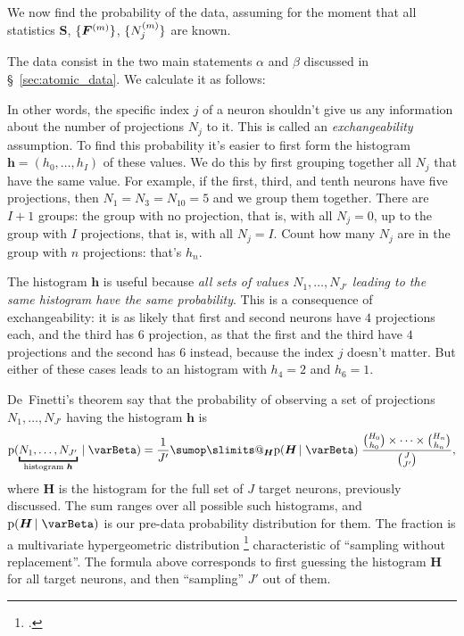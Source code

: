 \documentclass[\ifafour a4paper,12pt,\else a5paper,10pt,\fi%
onecolumn,oneside,article,%
british%
]{memoir}
\makeatletter
\theoremstyle{remark}
\theoremstyle{innote}
\def\sum{\DOTSI\sumop\slimits@}
\newcommand*{\citep}{\footcites}
\newcommand*{\pf}{\mathrm{p}}%
\renewcommand*{\|}[1][]{\nonscript\,#1\vert\nonscript\;\mathopen{}}
\newcommand*{\sect}{\S}%
\newcommand*{\chap}{ch.}%
\newcommand*{\yI}{\varBeta}
\newcommand*{\yF}{\bm{F}}
\newcommand*{\yFm}[1][m]{\yF^{(#1)}}
\newcommand*{\yh}{\bm{h}}
\newcommand*{\yH}{\bm{H}}
\newcommand*{\yNm}[1][m]{N^{(#1)}}
\newcommand*{\ySS}{S}
\newcommand*{\yS}{\bm{\ySS}}
\DeclarePairedDelimiter\tu{\{}{\}}
\newcommand*{\ka}{\alpha}
\newcommand*{\kb}{\beta}
\makeatother
\begin{document}
\medskip

We now find the probability of the data, assuming for the moment that all
statistics $\yS$, $\tu{\yFm}$, $\tu{\yNm_{j}}$ are known.

The data consist in the two main statements $\ka$ and $\kb$ discussed in
\sect~\ref{sec:atomic_data}. We calculate it as follows:






\clearpage

\bigskip


In other words, the specific index $j$
of a neuron shouldn't give us any information about the number of
projections $N_{j}$ to it. This is called an \emph{exchangeability}
assumption. To find this probability it's easier to first form the
histogram $\yh=(h_{0},\dotsc,h_{I})$ of these values. We do this by first
grouping together all $N_{j}$ that have the same value. For example, if the
first, third, and tenth neurons have five projections, then
$N_{1}=N_{3}=N_{10}=5$ and we group them together. There are $I+1$ groups:
the group with no projection, that is, with all $N_{j}=0$, up to the group
with $I$ projections, that is, with all $N_{j}=I$. Count how many $N_{j}$
are in the group with $n$ projections: that's $h_{n}$.

The histogram $\yh$ is useful because \emph{all sets of values
  $N_{1},\dotsc,N_{J'}$ leading to the same histogram have the same
  probability}. This is a consequence of exchangeability: it is as likely
that first and second neurons have $4$ projections each, and the third has
$6$ projection, as that the first and the third have $4$ projections and
the second has $6$ instead, because the index $j$ doesn't matter. But
either of these cases leads to an histogram with $h_{4}=2$ and $h_{6}=1$.

De~Finetti's theorem say that the probability of observing a set of
projections $N_{1},\dotsc,N_{J'}$ having the histogram $\yh$ is
\begin{equation}
  \label{eq:definetti_Nj_finite}
  \pf(\underbracket{N_{1},\dotsc,N_{J'}}_{\text{histogram $\yh$}} \| \yI) =
\frac{1}{J'}  \sum_{\yH} \pf(\yH \| \yI)\;
  \frac{\binom{H_{0}}{h_{0}}\times\dotsm\times\binom{H_{n}}{h_{n}}}{\binom{J}{J'}},
\end{equation}
where $\yH$ is the histogram for the full set of $J$ target neurons,
previously discussed. The sum ranges over all possible such histograms, and
$\pf(\yH \| \yI)$ is our pre-data probability distribution for them. The
fraction is a multivariate hypergeometric distribution
\citep[\chap~39]{johnsonetal1969_r1996} characteristic of \enquote{sampling
  without replacement}. The formula above corresponds to first guessing the
histogram $\yH$ for all target neurons, and then \enquote{sampling} $J'$
out of them.
\end{document}
